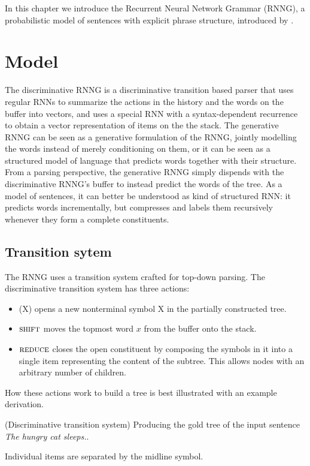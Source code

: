% 

In this chapter we introduce the Recurrent Neural Network Grammar (RNNG), a probabilistic model of sentences with explicit phrase structure, introduced by \citet{dyer2016rnng}.

\section{Model}
The discriminative RNNG is a discriminative transition based parser that uses regular RNNs to summarize the actions in the history and the words on the buffer into vectors, and uses a special RNN with a syntax-dependent recurrence to obtain a vector representation of items on the the stack. The generative RNNG can be seen as a generative formulation of the RNNG, jointly modelling the words instead of merely conditioning on them, or it can be seen as a structured model of language that predicts words together with their structure. From a parsing perspective, the generative RNNG simply dispends with the discriminative RNNG's buffer to instead predict the words of the tree. As a model of sentences, it can better be understood as kind of structured RNN: it predicts words incrementally, but compresses and labels them recursively whenever they form a complete constituents.

\subsection{Transition sytem}
The RNNG uses a transition system crafted for top-down parsing. The discriminative transition system has three actions:
\begin{itemize}
  \item \open(X) opens a new nonterminal symbol X in the partially constructed tree.
  \item $\textsc{shift}$ moves the topmost word $x$ from the buffer onto the stack.
  \item $\textsc{reduce}$ closes the open constituent by composing the symbols in it into a single item representing the content of the subtree. This allows nodes with an arbitrary number of children.
\end{itemize}
How these actions work to build a tree is best illustrated with an example derivation.

\begin{example}{(Discriminative transition system)}
  \label{ex:disc-states}
  Producing the gold tree of the input sentence \textit{The hungry cat sleeps.}.
  
  Individual items are separated by the midline symbol.
\end{example}

